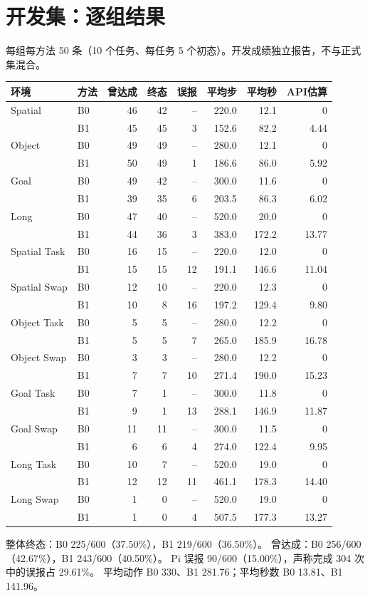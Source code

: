 \documentclass[UTF8,11pt,a4paper]{ctexart}
\begin{document}
\section{开发集：逐组结果}
每组每方法 50 条（10 个任务、每任务 5 个初态）。开发成绩独立报告，不与正式集混合。
\begin{center}\small
\begin{tabular}{llrrrrrr}
\toprule
环境 & 方法 & 曾达成 & 终态 & 误报 & 平均步 & 平均秒 & API估算\\
\midrule
Spatial & B0 & 46 & 42 & -- & 220.0 & 12.1 & 0\\
 & B1 & 45 & 45 & 3 & 152.6 & 82.2 & 4.44\\
Object & B0 & 49 & 49 & -- & 280.0 & 12.1 & 0\\
 & B1 & 50 & 49 & 1 & 186.6 & 86.0 & 5.92\\
Goal & B0 & 49 & 42 & -- & 300.0 & 11.6 & 0\\
 & B1 & 39 & 35 & 6 & 203.5 & 86.3 & 6.02\\
Long & B0 & 47 & 40 & -- & 520.0 & 20.0 & 0\\
 & B1 & 44 & 36 & 3 & 383.0 & 172.2 & 13.77\\
\midrule
Spatial Task & B0 & 16 & 15 & -- & 220.0 & 12.0 & 0\\
 & B1 & 15 & 15 & 12 & 191.1 & 146.6 & 11.04\\
Spatial Swap & B0 & 12 & 10 & -- & 220.0 & 12.3 & 0\\
 & B1 & 10 & 8 & 16 & 197.2 & 129.4 & 9.80\\
Object Task & B0 & 5 & 5 & -- & 280.0 & 12.2 & 0\\
 & B1 & 5 & 5 & 7 & 265.0 & 185.9 & 16.78\\
Object Swap & B0 & 3 & 3 & -- & 280.0 & 12.2 & 0\\
 & B1 & 7 & 7 & 10 & 271.4 & 190.0 & 15.23\\
Goal Task & B0 & 7 & 1 & -- & 300.0 & 11.8 & 0\\
 & B1 & 9 & 1 & 13 & 288.1 & 146.9 & 11.87\\
Goal Swap & B0 & 11 & 11 & -- & 300.0 & 11.5 & 0\\
 & B1 & 6 & 6 & 4 & 274.0 & 122.4 & 9.95\\
Long Task & B0 & 10 & 7 & -- & 520.0 & 19.0 & 0\\
 & B1 & 12 & 12 & 11 & 461.1 & 178.3 & 14.40\\
Long Swap & B0 & 1 & 0 & -- & 520.0 & 19.0 & 0\\
 & B1 & 1 & 0 & 4 & 507.5 & 177.3 & 13.27\\
\bottomrule
\end{tabular}
\end{center}
整体终态：B0 225/600（37.50\%），B1 219/600（36.50\%）。
曾达成：B0 256/600（42.67\%），B1 243/600（40.50\%）。
Pi 误报 90/600（15.00\%），声称完成 304 次中的误报占 29.61\%。
平均动作 B0 330、B1 281.76；平均秒数 B0 13.81、B1 141.96。
\newpage
\end{document}
